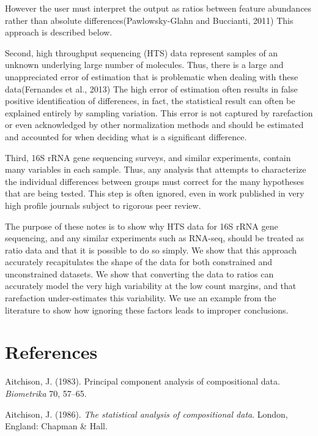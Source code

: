 \documentclass[twocolumn]{article}
\begin{document}
However the user must interpret the output as ratios between feature
abundances rather than absolute differences(Pawlowsky-Glahn and
Buccianti, 2011) This approach is described below.

Second, high throughput sequencing (HTS) data represent samples of an
unknown underlying large number of molecules. Thus, there is a large and
unappreciated error of estimation that is problematic when dealing with
these data(Fernandes et al., 2013) The high error of estimation often
results in false positive identification of differences, in fact, the
statistical result can often be explained entirely by sampling
variation. This error is not captured by rarefaction or even
acknowledged by other normalization methods and should be estimated and
accounted for when deciding what is a significant difference.

Third, 16S rRNA gene sequencing surveys, and similar experiments,
contain many variables in each sample. Thus, any analysis that attempts
to characterize the individual differences between groups must correct
for the many hypotheses that are being tested. This step is often
ignored, even in work published in very high profile journals subject to
rigorous peer review.

The purpose of these notes is to show why HTS data for 16S rRNA gene
sequencing, and any similar experiments such as RNA-seq, should be
treated as ratio data and that it is possible to do so simply. We show
that this approach accurately recapitulates the shape of the data for
both constrained and unconstrained datasets. We show that converting the
data to ratios can accurately model the very high variability at the low
count margins, and that rarefaction under-estimates this variability. We
use an example from the literature to show how ignoring these factors
leads to improper conclusions.

\clearpage

\section*{References}\label{references}

Aitchison, J. (1983). Principal component analysis of compositional
data. \emph{Biometrika} 70, 57--65.

Aitchison, J. (1986). \emph{The statistical analysis of compositional
data}. London, England: Chapman \& Hall.
\end{document}

